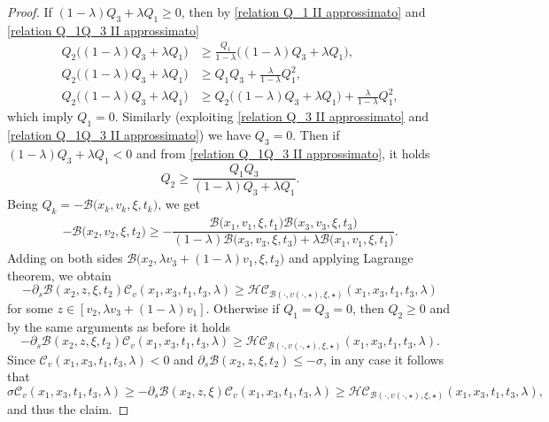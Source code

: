 \documentclass[11pt, reqno]{amsart}
\theoremstyle{definition}
\numberwithin{equation}{section}
\begin{document}
\begin{proof}
		If $(1-\lambda)Q_3+\lambda Q_1\geq0$, then by \eqref{relation Q_1 II approssimato} and \eqref{relation Q_1Q_3 II approssimato}
		\begin{align*}
			Q_2 \big( (1-\lambda)Q_3+\lambda Q_1 \big)&\geq \frac{Q_1}{1-\lambda}\big( (1-\lambda)Q_3+\lambda Q_1\big),\\
			Q_2\big( (1-\lambda)Q_3+\lambda Q_1 \big)&\geq Q_1Q_3+\frac{\lambda}{1-\lambda}Q_1^2,\\
			Q_2\big( (1-\lambda)Q_3+\lambda Q_1 \big)&\geq 	Q_2\big( (1-\lambda)Q_3+\lambda Q_1 \big)+\frac{\lambda}{1-\lambda}Q_1^2,
		\end{align*}
		which imply $Q_1=0$. Similarly (exploiting \eqref{relation Q_3 II approssimato} and \eqref{relation Q_1Q_3 II approssimato}) we have $Q_3=0$.
		Then if $(1-\lambda)Q_3+\lambda Q_1<0$ and from \eqref{relation Q_1Q_3 II approssimato}, it holds
		\[ Q_2\geq \dfrac{Q_1Q_3}{(1-\lambda)Q_3+\lambda Q_1}. \]
Being $Q_k = -\mathscr{B}\big(x_k,v_k, \xi, t_k\big)$, we get 
	\begin{align*}
		-\mathscr{B}\big(x_2,v_2,\xi, t_2\big)\geq - \dfrac{\mathscr{B}\big(x_1,v_1,\xi, t_1\big)\mathscr{B}(x_3,v_3,\xi, t_3\big)}{(1-\lambda)\mathscr{B}\big(x_3,v_3,\xi, t_3\big)+\lambda \mathscr{B}\big(x_1,v_1,\xi, t_1\big)}.
	\end{align*}
	Adding on both sides $\mathscr{B}\big(x_2,\lambda v_3+(1-\lambda)v_1,\xi, t_2\big)$ and applying Lagrange theorem, we obtain
$$-\partial_s\mathscr{B}(x_2,z,\xi, t_2)\mathcal{C}_v(x_1,x_3,t_1,t_3,\lambda)\geq \mathcal{HC}_{\mathscr{B}(\cdot, v(\cdot,\star),\xi, \star)}(x_1,x_3,t_1,t_3,\lambda)$$
	for some $z\in [v_2,\lambda v_3+(1-\lambda)v_1]$. 
	Otherwise if $Q_1=Q_3=0$, then $Q_2\geq 0$ and by the same arguments as before it holds
	\[		-\partial_s\mathscr{B}(x_2,z,\xi, t_2)\mathcal{C}_v(x_1,x_3,t_1,t_3,\lambda)\geq \mathcal{HC}_{\mathscr{B}(\cdot, v(\cdot,\star),\xi,\star)}(x_1,x_3,t_1,t_3,\lambda).\]
	Since $\mathcal{C}_v(x_1,x_3,t_1,t_3,\lambda)<0$ and $\partial_s \mathscr{B}(x_2,z,\xi, t_2)\leq-\sigma$, in any case it follows that
	\[	\sigma \mathcal{C}_v(x_1,x_3,t_1,t_3,\lambda)\geq -\partial_s\mathscr{B}(x_2,z,\xi)\mathcal{C}_v(x_1,x_3,t_1,t_3,\lambda)\geq \mathcal{HC}_{\mathscr{B}(\cdot, v(\cdot,\star),\xi,\star)}(x_1,x_3,t_1,t_3,\lambda), \]
and thus the claim.
\qedhere	
\end{proof}
\end{document}
